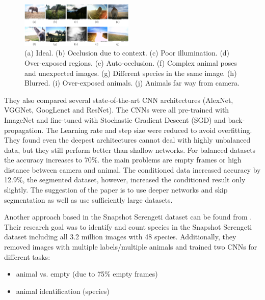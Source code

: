 \documentclass[electronic]{vgtc}             %
\begin{document}
	\begin{figure}[h]
		\includegraphics[width=0.48\textwidth]{quality2}
		\caption{ (a) Ideal. (b) Occlusion due
			to context. (c) Poor illumination. (d) Over-exposed regions. (e) Auto-occlusion. (f)	Complex animal poses and unexpected images. (g) Different species in the same image.	(h) Blurred. (i) Over-exposed animals. (j) Animals far way from camera.\cite{Gomez:2016}}
		\label{fig:quality2}
	\end{figure}
	
	They also compared several state-of-the-art CNN architectures (AlexNet, VGGNet, GoogLenet and ResNet).
	The CNNs were all pre-trained with ImageNet and fine-tuned with Stochastic Gradient Descent (SGD) and back-propagation. The Learning rate and step size were reduced to avoid overfitting.
	They found even the deepest architectures cannot deal with highly unbalanced data, but they still perform better than shallow networks.
	For balanced datasets the accuracy increases to 70\%.
	the main problems are empty frames or high distance between camera and animal.
	The conditioned data increased accuracy by 12.9\%, the segmented dataset, however, increased the conditioned result only slightly.
	The suggestion of the paper is to use deeper networks and skip segmentation as well as use sufficiently large datasets.
	
	Another approach based in the Snapshot Serengeti dataset can be found from \cite{Norouzzadeh:2017, Norouzzadeh:2017:Count}. 
	Their research goal was to identify and count species in the Snapshot Serengeti dataset including all 3.2 million images with 48 species. 
	Additionally, they removed images with multiple labels/multiple animals and trained two CNNs for different tasks:
	\begin{itemize}
		\item animal vs. empty (due to 75\% empty frames)
		\item animal identification (species)
	\end{itemize}
	
\end{document}
